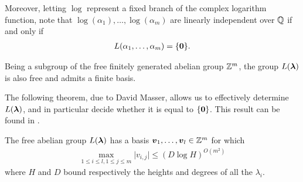 Moreover, letting $\log$ represent a fixed branch of the complex logarithm function, note that $\log(\alpha_{1}), \ldots, \log(\alpha_{m})$ are linearly independent over $\mathbb{Q}$ if and only if
\begin{align*}
L(\alpha_{1}, \ldots, \alpha_{m}) = \lbrace \boldsymbol{0} \rbrace .
\end{align*}

Being a subgroup of the free finitely generated abelian group $\mathbb{Z}^{m}$, the group $L(\boldsymbol{\lambda})$ is also free and admits a finite basis.

The following theorem, due to David Masser, allows us to effectively determine $L(\boldsymbol{\lambda})$, and in particular decide whether it is equal to $\lbrace \boldsymbol{0} \rbrace$. This result can be found in \cite{Masser}.

\begin{theorem}[Masser]
The free abelian group $L(\boldsymbol{\lambda})$ has a basis $\boldsymbol{v}_{1}, \ldots, \boldsymbol{v}_{l} \in \mathbb{Z}^{m}$ for which
\begin{align*}
\max\limits_{1 \leq i \leq l, 1 \leq j \leq m} \lvert v_{i,j} \rvert \leq (D \log H)^{O(m^{2})}
\end{align*}
where $H$ and $D$ bound respectively the heights and degrees of all the $\lambda_{i}$.
\end{theorem}

